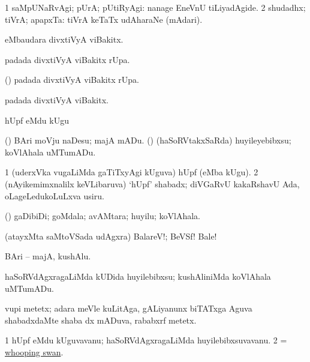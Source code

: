 \bentry
{}
\gl{\kirxvi}
\bmng
\bnum
\num{1} saMpUNaRvAgi; pUrA; pUtiRyAgi:  nanage EneVnU tiLiyadAgide. 
\num{2} shudadhx; tiVrA; apapxTa:  tiVrA keTaTx udAharaNe (mAdari). 
\enum
\emng
\eentry

\bentry
{}
\gl{\sanA}
\bmng
{} eMbaudara divxtiVyA viBakitx. 
\emng
\eentry

\bentry
{}
\gl{\sanA}
\bmng
{} padada divxtiVyA viBakitx rUpa. 
\emng
\eentry

\bentry
{}
\gl{\sanA}
\bmng
(\pArxparx)  padada divxtiVyA viBakitx rUpa. 
\emng
\eentry

\bentry
{}
\gl{\sanA}
\bmng
{} padada divxtiVyA viBakitx. 
\emng
\eentry

\bentry
{} 
\gl{\akirx}
\expl{}
\bmng
hUpf eMdu kUgu 
\emng

\noindent
\gl{\pagu} 
\bmng
  (\AmA) 
\banum
{} BAri moVju naDesu; majA mADu. 
 (\ame) (haSoRVtakxSaRda) huyileyebibxsu; koVlAhala uMTumADu. 
\eanum
\emng
\eentry

\bentry
{} 
\gl{\nA}
\bmng
\bnum
\num{1} (uderxVka \mo vugaLiMda gaTiTxyAgi kUguva) hUpf (eMba kUgu). 
\num{2} (nAyikemimxnalilx keVLibaruva) `hUpf' shabadx; diVGaRvU kakaRshavU Ada, oLageLedukoLuLxva usiru. 
\enum
\emng
\eentry

\bentry
{}
\gl{\nA}
\bmng
(\ame) gaDibiDi; goMdala; avAMtara; huyilu; koVlAhala. 
\emng
\eentry

\bentry
{}
\gl{\BAavayx}
\bmng
(atayxMta saMtoVSada udAgxra) BalareV!; BeVSf! Bale! 
\emng
\eentry

\bentry
{}
\gl{\nA}
\bmng
BAri -- majA, kushAlu. 
\emng

\noindent
\gl{\pagu}
\bmng
{} haSoRVdAgxragaLiMda kUDida huyilebibxsu; kushAliniMda koVlAhala uMTumADu. 
\emng
\eentry

\bentry
{}
\gl{\nA}
\bmng
vupi metetx; adara meVle kuLitAga, gALiyanunx biTATxga Aguva shabadxdaMte shaba dx mADuva, rababxrf metetx. 
\emng
\eentry

\bentry
{}
\gl{\nA}
\bmng
\bnum
\num{1} hUpf eMdu kUguvavanu; haSoRVdAgxragaLiMda huyilebibxsuvavanu. 
\num{2} = \hyperlink{whooping swan}{whooping swan}. 
\enum
\emng
\eentry

